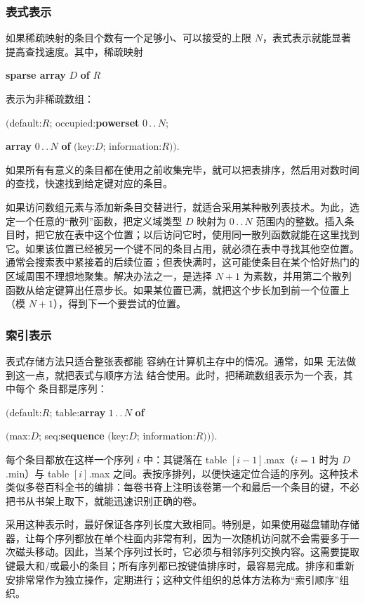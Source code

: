\subsubsection{表式表示}

如果稀疏映射的条目个数有一个足够小、可以接受的上限 $N$，表式表示就能显著提高查找速度。其中，稀疏映射

\quad \textbf{sparse array} $D$ \textbf{of} $R$

\noindent
表示为非稀疏数组：

\quad $($default:$R$; occupied:\textbf{powerset} $0\,.\,.\,N$;

\tabto*{8em}\textbf{array} $0\,.\,.\,N$ \textbf{of} $($key:$D$; information:$R))$.

\noindent
如果所有有意义的条目都在使用之前收集完毕，就可以把表排序，然后用对数时间的查找，快速找到给定键对应的条目。

如果访问数组元素与添加新条目交替进行，就适合采用某种散列表技术。为此，选定一个任意的“散列”函数，把定义域类型 $D$ 映射为 $0\,.\,.\,N$ 范围内的整数。插入条目时，把它放在表中这个位置；以后访问它时，使用同一散列函数就能在这里找到它。如果该位置已经被另一个键不同的条目占用，就必须在表中寻找其他空位置。通常会搜索表中紧接着的后续位置；但表快满时，这可能使条目在某个恰好热门的区域周围不理想地聚集。解决办法之一，是选择 $N + 1$ 为素数，并用第二个散列函数从给定键算出任意步长。如果某位置已满，就把这个步长加到前一个位置上（模 $N + 1$），得到下一个要尝试的位置。

\subsubsection{索引表示}

表式存储方法只适合整张表都能
容纳在计算机主存中的情况。通常，如果
无法做到这一点，就把表式与顺序方法
结合使用。此时，把稀疏数组表示为一个表，其中每个
条目都是序列：

\quad $($default:$R$; table:\textbf{array} $1\,.\,.\,N$ \textbf{of}

\tabto*{10em}$($max:$D$; seq:\textbf{sequence} $($key:$D$; information:$R)))$.

\noindent
每个条目都放在这样一个序列 $i$ 中：其键落在 table $[i - 1]$.max（$i = 1$ 时为 $D$.min）与 table $[i]$.max 之间。表按序排列，以便快速定位合适的序列。这种技术类似多卷百科全书的编排：每卷书脊上注明该卷第一个和最后一个条目的键，不必把书从书架上取下，就能迅速识别正确的卷。

采用这种表示时，最好保证各序列长度大致相同。特别是，如果使用磁盘辅助存储器，让每个序列都放在单个柱面内非常有利，因为一次随机访问就不会需要多于一次磁头移动。因此，当某个序列过长时，它必须与相邻序列交换内容。这需要提取键最大和/或最小的条目；所有序列都已按键值排序时，最容易完成。排序和重新安排常常作为独立操作，定期进行；这种文件组织的总体方法称为“索引顺序”组织。

